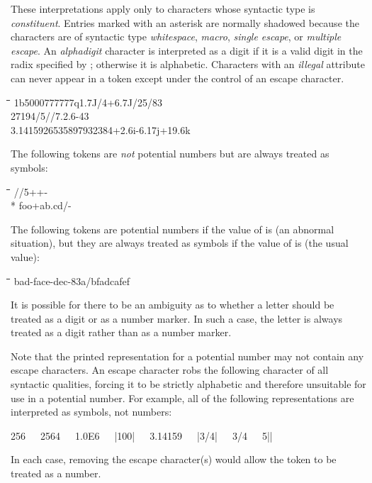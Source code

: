 \begin{table}
\vfill
\begin{footnotesize}
\noindent
These interpretations apply only to characters whose
syntactic type is \emph{constituent}.  Entries marked
with an asterisk are normally shadowed because the characters
are of syntactic type
\emph{whitespace}, \emph{macro}, \emph{single escape}, or \emph{multiple escape}.
An \emph{alphadigit} character is interpreted as a
digit if it is a valid digit in the radix specified by {\small {}};
otherwise it is alphabetic.
Characters with an \emph{illegal} attribute can never appear in
a token except under the control of an escape character.
\end{footnotesize}
\end{table}

\begin{lisp}
\linewidth\=\linewidth\=\linewidth\=\linewidth\=\kill
1b5000\>777777q\>1.7J/4+6.7J/25/83 \\
27{\Xcircumflex}194/5//7.2.6\>{\Xcircumflex}-43{\Xcircumflex} \\
3.141{\Xunderscore}592{\Xunderscore}653{\Xunderscore}589{\Xunderscore}793{\Xunderscore}238{\Xunderscore}4\>\>+2.6i-6.17j+19.6k
\end{lisp}
The following tokens are \emph{not} potential numbers but are always
treated as symbols:
\begin{lisp}
\linewidth\=\linewidth\=\linewidth\=\linewidth\=\kill
/\>/5\>++- \\*
foo+\>ab.cd\>{\Xunderscore}\>{\Xcircumflex}\>{\Xcircumflex}/-
\end{lisp}
The following tokens are potential numbers if the value of
 is  (an abnormal situation), but they are
always treated as symbols if the value of 
is  (the usual value):
\begin{lisp}
\linewidth\=\linewidth\=\linewidth\=\linewidth\=\kill
bad-face-dec-83\>a/b\>fad{\Xunderscore}cafe\>f{\Xcircumflex}
\end{lisp}
It is possible for there to be an ambiguity as to whether
a letter should be treated as a digit or as a number marker.
In such a case, the letter is always treated as a digit
rather than as a number marker.

Note that the printed representation for a potential
number may not contain any escape characters.
An escape character robs the following character of all syntactic
qualities, forcing it to be strictly alphabetic and therefore unsuitable
for use in a potential number.  For example,
all of the following representations are interpreted as symbols, not numbers:
\begin{lisp}
{\Xbackslash}256~~~25{\Xbackslash}64~~~1.0{\Xbackslash}E6~~~|100|~~~3{\Xbackslash}.14159~~~|3/4|~~~3{\Xbackslash}/4~~~5||
\end{lisp}
In each case, removing the escape character(s) would allow the token
to be treated as a number.

